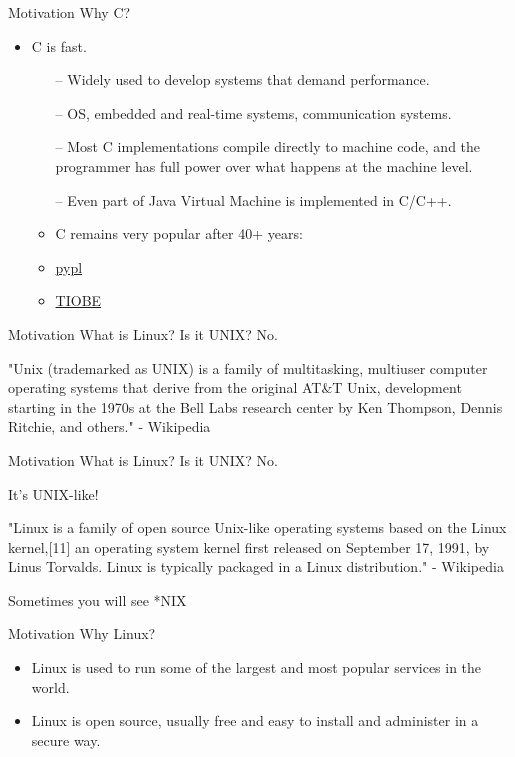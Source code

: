 \documentclass[10pt]{beamer}
\begin{document}
\begin{frame}[fragile]{Motivation}
Why C?
\begin{itemize}
	\item C is fast.
	\begin{itemize}
		\item[--] Widely used to develop systems that demand performance.
		\item[--] OS, embedded and real-time systems, communication systems.
		\item[--] Most C implementations compile directly to machine code, and the programmer has full power over what happens at the machine level.
		\item[--] Even part of Java Virtual Machine is implemented in C/C++.
		\item C remains very popular after 40+ years: 
		\item \hyperlink{https://pypl.github.io/PYPL.html}{pypl}
		\item \hyperlink{https://www.tiobe.com/tiobe-index/}{TIOBE}
	\end{itemize}

\end{itemize}
\end{frame}
\begin{frame}[fragile]{Motivation}
What is Linux? Is it UNIX? No.

"Unix (trademarked as UNIX) is a family of multitasking, multiuser computer operating systems that derive from the original AT\&T Unix, development starting in the 1970s at the Bell Labs research center by Ken Thompson, Dennis Ritchie, and others."
- Wikipedia
    
\end{frame}
\begin{frame}[fragile]{Motivation}
What is Linux? Is it UNIX? No.

It's UNIX-like!

"Linux is a family of open source Unix-like operating systems based on the Linux kernel,[11] an operating system kernel first released on September 17, 1991, by Linus Torvalds. Linux is typically packaged in a Linux distribution."
- Wikipedia

Sometimes you will see *NIX    
\end{frame}
\begin{frame}[fragile]{Motivation}
Why Linux?

\begin{itemize}
\item Linux is used to run some of the largest and most popular services in the world.
\item Linux is open source, usually free and easy to install and administer in a secure way.
\end{itemize}

\end{frame}
\end{document}
